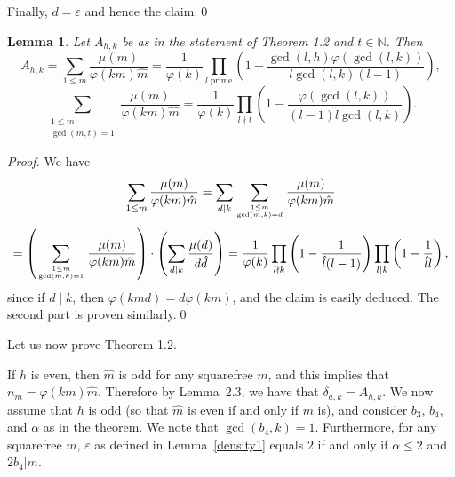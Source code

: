 \documentclass[twoside,final,reqno,noamsfonts]{birkartspecial}
\newtheorem{lemma}[theorem]{Lemma}
\begin{document}
Finally, $d=\varepsilon$ and hence the claim.\qed\par\medskip

\begin{lemma}\label{prud} Let $A_{h,k}$ be as in the statement of
Theorem 1.2 and $t\in {\mathbb N}$.
 Then
$$A_{h,k}=\sum_{1\le m}\frac{\mu(m)}{\varphi(km)\hat{m}}=\frac{1}{\varphi(k)}
\prod_{l\; \mathrm{prime}}
\left(1-\frac{\gcd (l,h)\varphi( \gcd (l,k))}{l \gcd (l,k)(l-1)}\right),$$
\begin{equation}\sum_{\substack{{1\le m}\\{\gcd(m,t)=1}}}\frac{\mu(m)}{\varphi(km)\hat{m}}=\frac{1}{\varphi(k)}\prod_{l\nmid t}
\left(1-\frac{\varphi(\gcd(l,k))}{(l-1)\hat{l} \gcd (l,k)}\right).\label{uso}
\end{equation}
\end{lemma}

\removelastskip\par\medskip
\noindent\emph{Proof.} We have
$$\sum_{1\le m}\frac{\mu(m)}{\varphi(km)\hat{m}}=\sum_{d\mid k}
\sum_{\genfrac{}{}{0pt}{}{1\le m}{\gcd (m,k)=d}}\frac{\mu(m)}{\varphi(km)\hat{m}}$$
\begin{equation}=\left(\sum_{\genfrac{}{}{0pt}{}{1\le m}{\gcd(m,k)=1}}\frac{\mu(m)}{\varphi(km)\hat{m}}
 \right)\cdot\left(\sum_{d\mid k}\frac{\mu(d)}{d\hat{d}}\right)
=\frac{1}{\varphi(k)}\prod_{l\nmid k}\left(1-\frac{1}{ \hat{l}(l-1)}\right)
\prod_{l\mid k}\left(1-\frac{1}{ \hat{l}l}\right),\nonumber\end{equation}
since if $d\mid k$, then $\varphi(k m d)=d\varphi(km)$, and the claim is easily deduced. The second part is proven similarly.\qed\par\medskip

Let us now prove Theorem 1.2.

If $h$ is even, then $\hat{m}$ is odd for any squarefree $m$,
 and this implies that $n_m=\varphi(km)\hat{m}$. Therefore
 by Lemma~2.3, we have that
$\delta_{a,k}=A_{h,k}.$ We now assume that $h$ is odd (so that
 $\hat{m}$ is even if and only if $m$ is), and
consider $b_{3}$, $b_{4}$, and $\alpha$ as in the theorem.
We note that $\gcd(b_4,k)=1$. Furthermore, for any squarefree $m$,
$\varepsilon$ as defined in Lemma~\ref{density1} equals $2$ if and only if
$\alpha\leq 2$ and $2b_4|m$.
\end{document}
